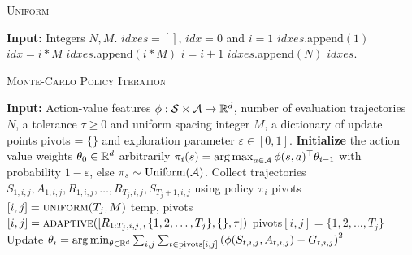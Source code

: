     \begin{algorithm}[t]
        \caption{\textsc{Uniform}}\label{alg:uniform}
        \begin{algorithmic}
        \State \textbf{Input:} Integers $N,M$.
        \State $idxes = []$, $idx = 0$ and $i=1$
        \State $idxes$.append$(1)$
        \State $idx = i * M$
        \State $idxes.$append$(i * M)$
        \State $i = i + 1$
        \EndWhile
        \State $idxes$.append$(N)$
        \State \Return $idxes$.
        \end{algorithmic}
        \end{algorithm}



        \begin{algorithm}[t]
            \caption{\textsc{Monte-Carlo Policy Iteration}}\label{alg:mc}
            \begin{algorithmic}
            \State \textbf{Input:} Action-value features $\phi: \mathcal{S} \times \mathcal{A} \rightarrow \mathbb{R}^d$, number of evaluation trajectories $N$, a tolerance $\tau \geq 0$ and uniform spacing integer $M$, a dictionary of update points pivots = $\{\}$ and exploration parameter $\varepsilon \in [0,1]$.
            \State \textbf{Initialize} the action value weights $\theta_0 \in \mathbb{R}^d$ arbitrarily
                \State $\pi_i(s) = \mathop{\rm arg\,max}_{a \in \mathcal{A}} \phi(s,a)^\top \theta_{i-1}$ with probability $1-\varepsilon$, else $\pi_s \sim \text{Uniform}(\mathcal{A})$.
                    \State Collect trajectories $S_{1,i,j},A_{1,i,j},R_{1,i,j},\dotsc,R_{T_j,i,j},S_{T_j+1,i,j}$ using policy $\pi_i$
                    \State pivots$[i,j] = \textsc{uniform}(T_j, M)$
                    \State temp, pivots$[i,j] = \textsc{adaptive}([R_{1:T_j,i,j}], \{1,2,\dotsc,T_j\},\{\}, \tau])$
                    \Else
                    \State pivots$[i,j]=\{1,2,\dotsc,T_j\}$
                    \EndIf
                \EndFor
                \State Update $\theta_i = \mathop{\rm arg\,min}_{\theta \in \mathbb{R}^d} \sum_{i,j}\sum_{t\in\text{pivots}[i,j]} \left(\phi(S_{t,i,j},A_{t,i,j}) - G_{t,i,j}\right)^2$
            \EndFor
            \end{algorithmic}
            \end{algorithm}
